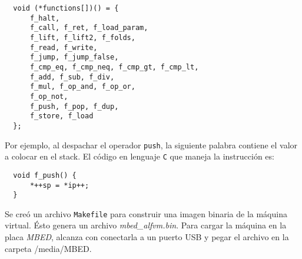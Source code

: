 \begin{Verbatim}
  void (*functions[])() = {
      f_halt,
      f_call, f_ret, f_load_param,
      f_lift, f_lift2, f_folds,
      f_read, f_write,
      f_jump, f_jump_false,
      f_cmp_eq, f_cmp_neq, f_cmp_gt, f_cmp_lt,
      f_add, f_sub, f_div,
      f_mul, f_op_and, f_op_or,
      f_op_not,
      f_push, f_pop, f_dup,
      f_store, f_load
  };
\end{Verbatim}

  Por ejemplo, al despachar el operador \texttt{push}, la siguiente palabra contiene
  el valor a colocar en el stack. El código en lenguaje \texttt{C} que maneja la instrucción es:

\begin{Verbatim}
  void f_push() {
      *++sp = *ip++;
  }
\end{Verbatim}

  Se creó un archivo \texttt{Makefile} para construir una imagen
  binaria de la máquina virtual.
  Ésto genera un archivo \emph{mbed\_alfvm.bin}.
  Para cargar la máquina en la placa \textit{MBED}, alcanza con conectarla
a un puerto USB y pegar el archivo en la carpeta /media/MBED.
